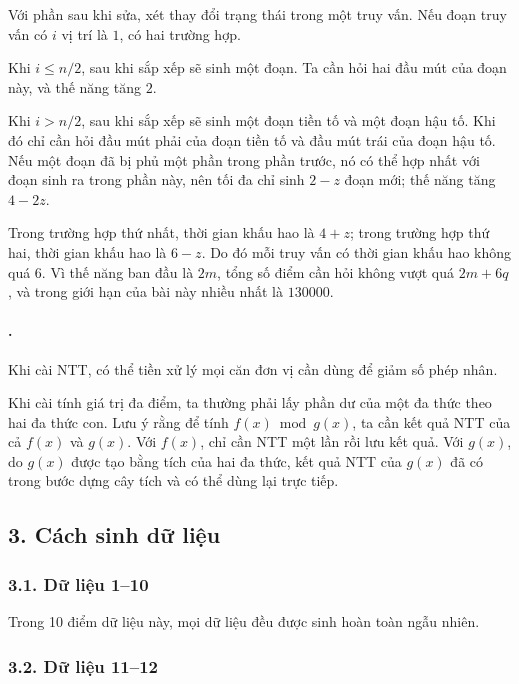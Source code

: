 \documentclass[11pt]{article}
\begin{document}
Với phần sau khi sửa, xét thay đổi trạng thái trong một truy vấn. Nếu đoạn
truy vấn có \(i\) vị trí là \(1\), có hai trường hợp.

Khi \(i\le n/2\), sau khi sắp xếp sẽ sinh một đoạn. Ta cần hỏi hai đầu mút của
đoạn này, và thế năng tăng \(2\).

Khi \(i>n/2\), sau khi sắp xếp sẽ sinh một đoạn tiền tố và một đoạn hậu tố.
Khi đó chỉ cần hỏi đầu mút phải của đoạn tiền tố và đầu mút trái của đoạn hậu
tố. Nếu một đoạn đã bị phủ một phần trong phần trước, nó có thể hợp nhất với
đoạn sinh ra trong phần này, nên tối đa chỉ sinh \(2-z\) đoạn mới; thế năng
tăng \(4-2z\).

Trong trường hợp thứ nhất, thời gian khấu hao là \(4+z\); trong trường hợp thứ
hai, thời gian khấu hao là \(6-z\). Do đó mỗi truy vấn có thời gian khấu hao
không quá \(6\). Vì thế năng ban đầu là \(2m\), tổng số điểm cần hỏi không
vượt quá \(2m+6q\), và trong giới hạn của bài này nhiều nhất là \(130000\).

\paragraph{.}
Khi cài NTT, có thể tiền xử lý mọi căn đơn vị cần dùng để giảm số phép nhân.

Khi cài tính giá trị đa điểm, ta thường phải lấy phần dư của một đa thức theo
hai đa thức con. Lưu ý rằng để tính \(f(x)\bmod g(x)\), ta cần kết quả NTT
của cả \(f(x)\) và \(g(x)\). Với \(f(x)\), chỉ cần NTT một lần rồi lưu kết quả.
Với \(g(x)\), do \(g(x)\) được tạo bằng tích của hai đa thức, kết quả NTT của
\(g(x)\) đã có trong bước dựng cây tích và có thể dùng lại trực tiếp.

\subsection*{3. Cách sinh dữ liệu}

\subsubsection*{3.1. Dữ liệu 1--10}

Trong 10 điểm dữ liệu này, mọi dữ liệu đều được sinh hoàn toàn ngẫu nhiên.

\subsubsection*{3.2. Dữ liệu 11--12}
\end{document}
